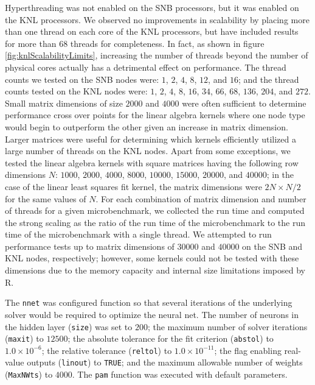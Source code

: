 Hyperthreading was not enabled on the SNB processors, but it was enabled on the KNL
processors. We observed no improvements in scalability by placing more than one thread on
each core of the KNL processors, but have included results for more than 68 threads for
completeness. In fact, as shown in figure \ref{fig:knlScalabilityLimits}, increasing the
number of threads beyond the number of physical cores actually has a detrimental effect on
performance. The thread counts we tested on the SNB nodes were: $1$, $2$, $4$, $8$, $12$, and
$16$; and the thread counts tested on the KNL nodes were: $1$, $2$, $4$, $8$, $16$, $34$,
$66$, $68$, $136$, $204$, and $272$. Small matrix dimensions of size $2000$ and $4000$
were often sufficient to determine performance cross over points for the linear algebra
kernels where one node type would begin to outperform the other given an increase in
matrix dimension. Larger matrices were useful for determining which kernels efficiently
utilized a large number of threads on the KNL nodes. Apart from some
exceptions, we tested the linear algebra kernels with square matrices having the following
row dimensions $N$: $1000$, $2000$, $4000$, $8000$, $10000$, $15000$, $20000$, and
$40000$; in the case of the linear least squares fit kernel, the matrix dimensions were
$2N \times N/2$ for the same values of $N$. For each combination of matrix dimension and
number of threads for a given microbenchmark, we collected the run time and computed the
strong scaling as the ratio of the run time of the microbenchmark to the run time of the
microbenchmark with a single thread. We attempted to run performance tests up to matrix
dimensions of $30000$ and $40000$ on the SNB and KNL nodes,
respectively; however, some kernels could not be tested with these dimensions due to the
memory capacity and internal size limitations imposed by R.

The \texttt{nnet} was configured function so that several iterations of the underlying
solver would be required to optimize the neural net. The number of neurons in the hidden
layer (\texttt{size}) was set to $200$; the maximum number of solver iterations
(\texttt{maxit}) to $12500$; the absolute tolerance for the fit criterion
(\texttt{abstol}) to $1.0\times 10^{-6}$; the relative tolerance (\texttt{reltol}) to
$1.0\times 10^{-11}$; the flag enabling real-value outputs (\texttt{linout}) to
\texttt{TRUE}; and the maximum allowable number of weights (\texttt{MaxNWts}) to $4000$.
The \texttt{pam} function was executed with default parameters.

